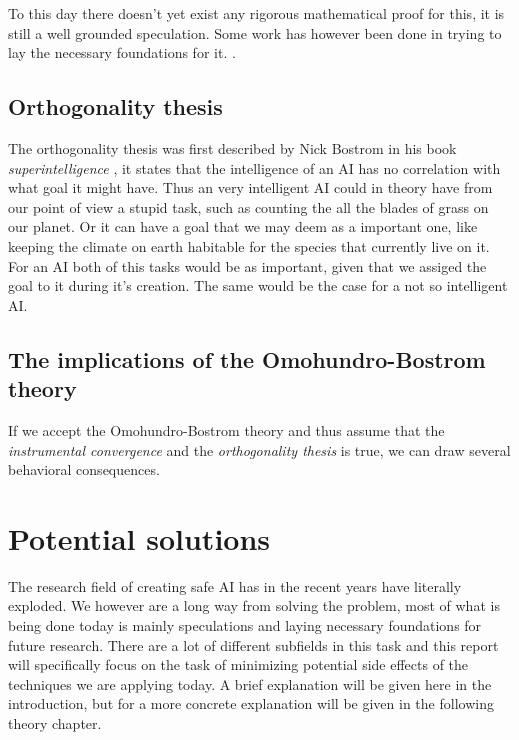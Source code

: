 \documentclass[12pt,A4]{report}
\theoremstyle{definition}
\begin{document}
To this day there doesn't yet exist any rigorous mathematical proof for this, it is still a well grounded speculation. Some work has however been done in trying to lay the necessary foundations for it. \autocite{TURNER et al}.  

\subsection{Orthogonality thesis}
The orthogonality thesis was first described by Nick Bostrom in his book \textit{superintelligence} \cite{Bostrom}, it states that the intelligence of an AI has no correlation with what goal it might have. Thus an very intelligent AI could in theory have from our point of view a stupid task, such as counting the all the blades of grass on our planet. Or it can have a goal that we may deem as a important one, like keeping the climate on earth habitable for the species that currently live on it. For an AI both of this tasks would be as important, given that we assiged the goal to it during it's creation. The same would be the case for a not so intelligent AI.


\subsection{The implications of the Omohundro-Bostrom theory}
If we accept the Omohundro-Bostrom theory and thus assume that the \textit{instrumental convergence} and the \textit{orthogonality thesis} is true, we can draw several behavioral consequences.

\section{Potential solutions}
The research field of creating safe AI has in the recent years have literally exploded. We however are a long way from solving the problem, most of what is being done today is mainly speculations and laying necessary foundations for future research. There are a lot of different subfields in this task and this report will specifically focus on the task of minimizing potential side effects of the techniques we are applying today. A brief explanation will be given here in the introduction, but for a more concrete explanation will be given in the following theory chapter.  
\end{document}
